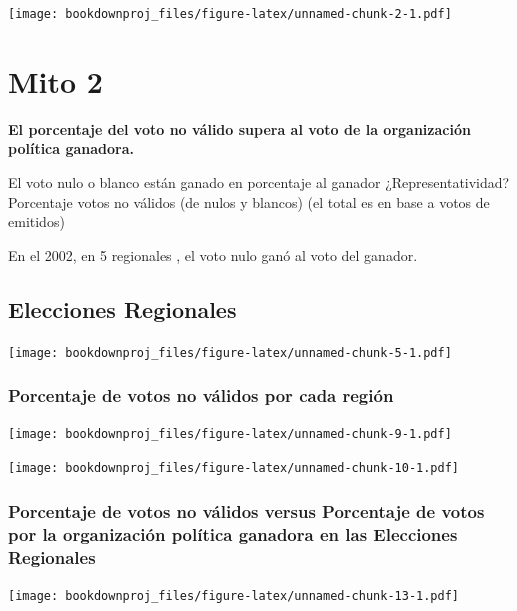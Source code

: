 \documentclass[
]{book}
\theoremstyle{definition}
\theoremstyle{definition}
\theoremstyle{definition}
\theoremstyle{definition}
\theoremstyle{remark}
\begin{document}
\texttt{[image: bookdownproj\_files/figure-latex/unnamed-chunk-2-1.pdf]}

\hypertarget{mito2}{%
\chapter{Mito 2}\label{mito2}}

\textbf{El porcentaje del voto no válido supera al voto de la organización política ganadora.}

El voto nulo o blanco están ganado en porcentaje al ganador
¿Representatividad?
Porcentaje votos no válidos (de nulos y blancos) (el total es en base a votos de emitidos)

En el 2002, en 5 regionales , el voto nulo ganó al voto del ganador.

\hypertarget{elecciones-regionales}{%
\section{Elecciones Regionales}\label{elecciones-regionales}}

\texttt{[image: bookdownproj\_files/figure-latex/unnamed-chunk-5-1.pdf]}

\hypertarget{porcentaje-de-votos-no-vuxe1lidos-por-cada-regiuxf3n}{%
\subsection{Porcentaje de votos no válidos por cada región}\label{porcentaje-de-votos-no-vuxe1lidos-por-cada-regiuxf3n}}

\texttt{[image: bookdownproj\_files/figure-latex/unnamed-chunk-9-1.pdf]}

\texttt{[image: bookdownproj\_files/figure-latex/unnamed-chunk-10-1.pdf]}

\hypertarget{porcentaje-de-votos-no-vuxe1lidos-versus-porcentaje-de-votos-por-la-organizaciuxf3n-poluxedtica-ganadora-en-las-elecciones-regionales}{%
\subsection{Porcentaje de votos no válidos versus Porcentaje de votos por la organización política ganadora en las Elecciones Regionales}\label{porcentaje-de-votos-no-vuxe1lidos-versus-porcentaje-de-votos-por-la-organizaciuxf3n-poluxedtica-ganadora-en-las-elecciones-regionales}}

\texttt{[image: bookdownproj\_files/figure-latex/unnamed-chunk-13-1.pdf]}
\end{document}
